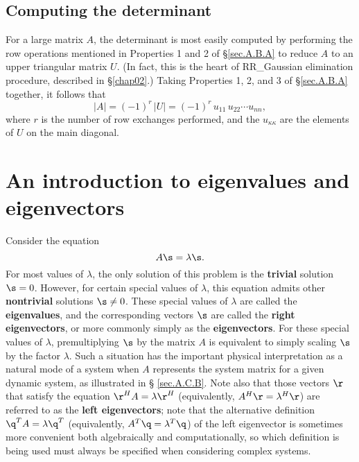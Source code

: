 \subsection{Computing the determinant}\label{sec.A.B.B}

For a large matrix $A$, the determinant is most easily computed by
performing the row operations mentioned in Properties 1 and 2
of \S \ref{sec.A.B.A} to reduce $A$ to an upper triangular
matrix $U$.  (In fact, this is the heart of RR_Gaussian elimination
procedure, described in \S \ref{chap02}.)  Taking Properties 1, 2, and
3 of \S \ref{sec.A.B.A} together, it follows that
\begin{equation*}
|A| = (-1)^r\,|U| = (-1)^r\,u_{11}\,u_{22}\cdots u_{nn},
\end{equation*}
where $r$ is the number of row exchanges performed, and the
$u_{\kappa\kappa}$ are the elements of $U$ on the main
diagonal.  

\section{An introduction to eigenvalues and eigenvectors}\label{sec.A.C}

Consider the equation
\begin{equation}
A\s = \lambda \s.
\label{emodedef}
\end{equation}
For most values of $\lambda$, the only solution of this problem is the
{\bf trivial} solution $\s=0$.  However, for certain special values of
$\lambda$, this equation admits other {\bf nontrivial} solutions $\s\ne
0$.  These special values of $\lambda$ are called the {\bf
eigenvalues}, and the corresponding vectors $\s$ are called the {\bf
right eigenvectors}, or more commonly simply as the {\bf
eigenvectors}.  For these special values of $\lambda$, premultiplying
$\s$ by the matrix $A$ is equivalent to simply scaling $\s$ by the
factor $\lambda$.  Such a situation has the important physical
interpretation as a natural mode of a system when $A$ represents the
system matrix for a given dynamic system, as illustrated in \S
\ref{sec.A.C.B}.  Note also that those vectors $\r$ that satisfy the
equation $\r^{H} A = \lambda \r^{H}$ (equivalently, $A^{H}\r=\lambda^{H} \r$) are referred to as the {\bf left eigenvectors};
note that the alternative definition $\q^{T} A = \lambda \q^{T}$  (equivalently, $A^{T}\q=\lambda^{T} \q$)
of the left eigenvector is sometimes more convenient both algebraically and computationally,
so which definition is being used must always be specified when considering complex systems.


